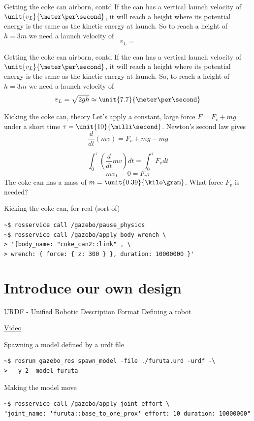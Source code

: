 \documentclass[presentation,aspectratio=1610]{beamer}
\begin{document}
\begin{frame}[label={sec:org5143ecb}]{Getting the coke can airborn, contd}
If the can has a vertical launch velocity of \(\unit{v_L}{\meter\per\second}\), it will reach a height where its potential energy is the same as the kinetic energy at launch. So to reach a height of \(h=\unit{3}{m}\) we need a launch velocity of
\[ v_L = \]
\end{frame}

\begin{frame}[label={sec:orga352c4e}]{Getting the coke can airborn, contd}
If the can has a vertical launch velocity of \(\unit{v_L}{\meter\per\second}\), it will reach a height where its potential energy is the same as the kinetic energy at launch. So, to reach a height of \(h=\unit{3}{m}\) we need a launch velocity of
\[ v_L = \sqrt{2gh} \approx \unit{7.7}{\meter\per\second}\]
\end{frame}

\begin{frame}[label={sec:org7f697b6}]{Kicking the coke can, theory}
Let's apply a constant, large force \(F=F_v+mg\) under a short time \(\tau=\unit{10}{\milli\second}\). Newton's second law gives
\[ \frac{d}{dt} (mv) = F_v + mg - mg \]

\[ \int_0^\tau (\frac{d}{dt} mv) dt = \int_0^\tau F_v dt\]
\pause
\[ mv_L - 0 = F_v \tau \]
The coke can has a mass of \(m=\unit{0.39}{\kilo\gram}\). What force \(F_v\) is needed?
\end{frame}


\begin{frame}[label={sec:org59f5f32},fragile]{Kicking the coke can, for real (sort of)}
 \begin{verbatim}
~$ rosservice call /gazebo/pause_physics
~$ rosservice call /gazebo/apply_body_wrench \
> '{body_name: "coke_can2::link" , \ 
> wrench: { force: { z: 300 } }, duration: 10000000 }'
\end{verbatim}
\end{frame}


\section{Introduce our own design}
\label{sec:org696fad6}
\begin{frame}[label={sec:orgbfc8910}]{URDF - Unified Robotic Description Format}
Defining a robot

\href{https://youtu.be/pT5iQaG9aVU}{Video}
\end{frame}

\begin{frame}[label={sec:org41e34b2},fragile]{Spawning a model defined by a urdf file}
 \begin{verbatim}
~$ rosrun gazebo_ros spawn_model -file ./furuta.urd -urdf -\
>   y 2 -model furuta
\end{verbatim}
\end{frame}
\begin{frame}[label={sec:orgccedc16},fragile]{Making the model move}
 \begin{verbatim}
~$ rosservice call /gazebo/apply_joint_effort \
"joint_name: 'furuta::base_to_one_prox' effort: 10 duration: 10000000"
\end{verbatim}
\end{frame}
\end{document}
